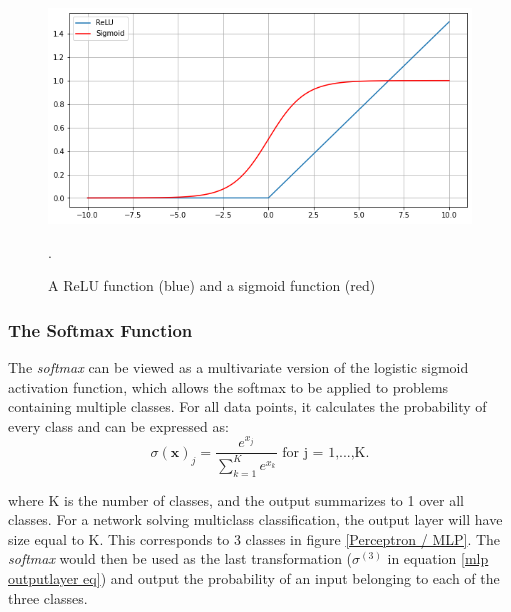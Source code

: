             \begin{figure}[H]
                \centering
                \includegraphics[scale=0.5]{figures/activation.png}
                \caption[ReLu and sigmoid]{A ReLU function (blue) and a sigmoid function (red)}.
              	\medskip 
                \label{activation_fig}
            \end{figure}

    \subsubsection{The Softmax Function}
        The \textit{softmax} can be viewed as a multivariate version of the logistic sigmoid activation function, which allows the softmax to be applied to problems containing multiple classes\cite{sharma2019new_activation_func}. For all data points, it calculates the probability of every class and can be expressed as:
        \begin{equation}
            \sigma(\textbf{x})_{j} = \dfrac{e^{x_{j}}}{\sum^{K}_{k=1}e^{x_{k}}} \textrm{ for j = 1,...,K.}
        \end{equation}
        
        where K is the number of classes, and the output summarizes to 1 over all classes. For a network solving multiclass classification, the output layer will have size equal to K. This corresponds to 3 classes in figure \ref{Perceptron / MLP}. The \textit{softmax} would then be used as the last transformation ($\sigma^{(3)}$ in equation \ref{mlp outputlayer eq}) and output the probability of an input belonging to each of the three classes.
        
